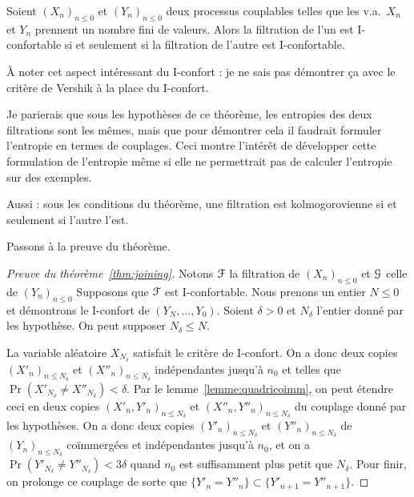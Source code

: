 \documentclass[12pt,a4paper]{article}
\begin{document}
\begin{thm}\label{thm:joining}
Soient ${(X_n)}_{n \leq 0}$ et ${(Y_n)}_{n \leq 0}$ deux processus couplables 
telles que les v.a.\ $X_n$ et $Y_n$ prennent un nombre fini de valeurs. 
Alors la filtration de l'un est I-confortable si et seulement si 
la filtration de l'autre est I-confortable.
\end{thm} 

À noter cet aspect intéressant du I-confort : 
je ne sais pas démontrer ça avec le critère de Vershik à la place du I-confort. 

Je parierais que sous les hypothèses de ce théorème, les entropies des deux 
filtrations sont les mêmes, mais que pour démontrer cela il faudrait formuler l'entropie en 
termes de couplages. Ceci montre l'intérêt de développer cette formulation 
de l'entropie même si elle ne permettrait pas de calculer l'entropie sur des exemples.

Aussi : sous les conditions du théorème, une filtration est kolmogorovienne si et seulement 
si l'autre l'est. 

Passons à la preuve du théorème.



\begin{proof}[Preuve du théorème~\ref{thm:joining}]
Notons $\EuScript{F}$ la filtration de  ${(X_n)}_{n \leq 0}$ et 
$\EuScript{G}$ celle de ${(Y_n)}_{n \leq 0}$
Supposons que $\EuScript{F}$ est I-confortable.
Nous prenons un entier $N \leq 0$ et démontrons le I-confort de 
$(Y_N, \ldots, Y_0)$.  
Soient $\delta >0$ et $N_\delta$ l'entier donné par les hypothèse. 
On peut supposer $N_\delta \leq N$. 

La variable aléatoire $X_{N_\delta}$ satisfait le critère de I-confort. 
On a donc deux copies ${(X'_n)}_{n \leq N_\delta}$ et ${(X''_n)}_{n \leq N_\delta}$ 
indépendantes jusqu'à $n_0$ et telles que $\Pr(X'_{N_\delta} \neq X''_{N_\delta}) < \delta$. 
Par le lemme~\ref{lemme:quadricoimm}, on peut étendre ceci 
en deux copies  ${(X'_n, Y'_n)}_{n \leq N_\delta}$ et ${(X''_n, Y''_n)}_{n \leq N_\delta}$ 
du couplage donné par les hypothèses. 
On a donc  deux copies ${(Y'_n)}_{n \leq N_\delta}$ et ${(Y''_n)}_{n \leq N_\delta}$ 
de ${(Y_n)}_{n \leq N_\delta}$ coïmmergées et indépendantes jusqu'à $n_0$, 
et on a $\Pr(Y'_{N_\delta} \neq Y''_{N_\delta}) < 3\delta$ 
quand $n_0$ est suffisamment plus petit que $N_\delta$. 
Pour finir, on prolonge ce couplage de sorte que 
$\{Y'_n = Y''_n\} \subset \{Y'_{n+1} = Y''_{n+1}\}$.
\end{proof}
\end{document}

